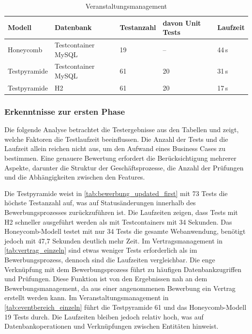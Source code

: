 \begin{table}[H]
	\centering
	\begin{tabular}{|l|l|l|l|l|}
		\hline
		\textbf{Modell} & \textbf{Datenbank} & \textbf{Testanzahl} & \textbf{davon Unit Tests} & \textbf{Laufzeit} \\
		\hline
		Honeycomb      & Testcontainer MySQL & 19  & --  & 44\,s \\
		\hline
		Testpyramide   & Testcontainer MySQL & 61  & 20  &31\,s   \\
		\hline
		Testpyramide   & H2                  & 61  & 20  & 17\,s    \\
		\hline
	\end{tabular}
		\caption{Veranstaltungsmanagement}
		\label{tab:eventbereich_einzeln}
\end{table}


\subsubsection{Erkenntnisse zur ersten Phase}
Die folgende Analyse betrachtet die Testergebnisse aus den Tabellen und zeigt, welche Faktoren die Testlaufzeit beeinflussen. Die Anzahl der Tests und die Laufzeit allein reichen nicht aus, um den Aufwand eines Business Cases zu bestimmen. Eine genauere Bewertung erfordert die Berücksichtigung mehrerer Aspekte, darunter die Struktur der Geschäftsprozesse, die Anzahl der Prüfungen und die Abhängigkeiten zwischen den Features.

Die Testpyramide weist in \autoref{tab:bewerbung_updated_first} mit 73 Tests die höchste Testanzahl auf, was auf Statusänderungen innerhalb des Bewerbungsprozesses zurückzuführen ist. Die Laufzeiten zeigen, dass Tests mit H2 schneller ausgeführt werden als mit Testcontainers mit 34 Sekunden. Das Honeycomb-Modell testet mit nur 34 Tests die gesamte Webanwendung, benötigt jedoch mit 47,7 Sekunden deutlich mehr Zeit.
Im Vertragsmanagement in \autoref{tab:vertrag_einzeln} sind etwas weniger Tests erforderlich als im Bewerbungsprozess, dennoch sind die Laufzeiten vergleichbar. Die enge Verknüpfung mit dem Bewerbungsprozess führt zu häufigen Datenbankzugriffen und Prüfungen. Diese Funktion ist von den Ergebnissen nah an dem Bewerbungsmanagement, da aus einer angenommenen Bewerbung ein Vertrag erstellt werden kann.
Im Veranstaltungsmanagement in \autoref{tab:eventbereich_einzeln} führt die Testpyramide 61 und das Honeycomb-Modell 19 Tests durch. Die Laufzeiten bleiben jedoch relativ hoch, was auf Datenbankoperationen und Verknüpfungen zwischen Entitäten hinweist.

